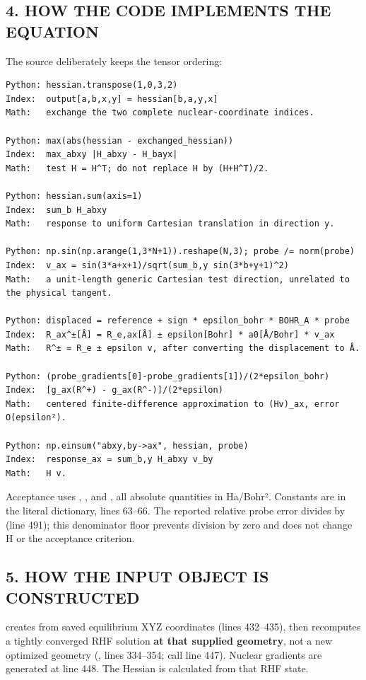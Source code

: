 \documentclass[10pt,a4paper]{article}
\begin{document}
\subsection{4. HOW THE CODE IMPLEMENTS THE EQUATION}
The source deliberately keeps the tensor ordering:

\begin{Verbatim}
Python: hessian.transpose(1,0,3,2)
Index:  output[a,b,x,y] = hessian[b,a,y,x]
Math:   exchange the two complete nuclear-coordinate indices.

Python: max(abs(hessian - exchanged_hessian))
Index:  max_abxy |H_abxy - H_bayx|
Math:   test H = H^T; do not replace H by (H+H^T)/2.

Python: hessian.sum(axis=1)
Index:  sum_b H_abxy
Math:   response to uniform Cartesian translation in direction y.

Python: np.sin(np.arange(1,3*N+1)).reshape(N,3); probe /= norm(probe)
Index:  v_ax = sin(3*a+x+1)/sqrt(sum_b,y sin(3*b+y+1)^2)
Math:   a unit-length generic Cartesian test direction, unrelated to the physical tangent.

Python: displaced = reference + sign * epsilon_bohr * BOHR_A * probe
Index:  R_ax^±[Å] = R_e,ax[Å] ± epsilon[Bohr] * a0[Å/Bohr] * v_ax
Math:   R^± = R_e ± epsilon v, after converting the displacement to Å.

Python: (probe_gradients[0]-probe_gradients[1])/(2*epsilon_bohr)
Index:  [g_ax(R^+) - g_ax(R^-)]/(2*epsilon)
Math:   centered finite-difference approximation to (Hv)_ax, error O(epsilon²).

Python: np.einsum("abxy,by->ax", hessian, probe)
Index:  response_ax = sum_b,y H_abxy v_by
Math:   H v.
\end{Verbatim}
Acceptance uses , , and , all absolute quantities in Ha/Bohr². Constants are in the literal  dictionary, lines 63–66. The reported relative probe error divides by  (line 491); this denominator floor prevents division by zero and does not change H or the acceptance criterion.

\subsection{5. HOW THE INPUT OBJECT IS CONSTRUCTED}
 creates  from saved equilibrium XYZ coordinates (lines 432–435), then recomputes a tightly converged RHF solution \textbf{at that supplied geometry}, not a new optimized geometry (, lines 334–354; call line 447). Nuclear gradients are generated at line 448. The Hessian is calculated from that RHF state.
\end{document}
